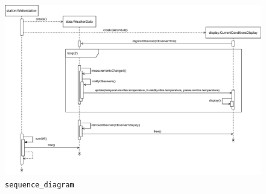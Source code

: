 \documentclass{article}
\begin{document}
    
    \begin{figure}[ht]
        \includegraphics[width=\textwidth]{swt_wende_tim_h09_sequence_diagram.pdf}
        \caption{\texttt{sequence\_diagram}}
    \end{figure}
\end{document}
